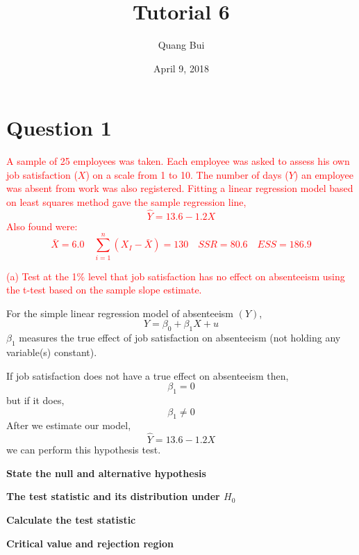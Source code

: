 \documentclass[12pt]{report}
\title{Tutorial 6}
\subtitle
{
\textbf{keywords}: hypothesis testing, t-test, test statistic, critical value, confidence intervals, R-squared, interpretation of coefficients, multiple linear regression, omitted variable bias

\textbf{estimated reading time}: 33 minutes
}
\author{Quang Bui}
\date{April 9, 2018}
\begin{document}
\maketitle

\section*{Question 1}
\noindent \textcolor{red}{A sample of 25 employees was taken. Each employee was asked to assess his own job satisfaction ($X$) on a scale from 1 to 10. The number of days ($Y$) an employee was absent from work was also registered. Fitting a linear regression model based on least squares method gave the sample regression line, $$\hat{Y} = 13.6 - 1.2X$$ Also found were: $$\bar{X} = 6.0 \quad \sum_{i=1}^{n}(X_I - \bar{X})=130 \quad SSR = 80.6 \quad ESS = 186.9$$}

\noindent \textcolor{red}{(a) Test at the 1\% level that job satisfaction has no effect on absenteeism using the t-test based on the sample slope estimate.}

\noindent For the simple linear regression model of absenteeism $(Y)$, $$Y = \beta_0 + \beta_1 X + u$$ $\beta_1$ measures the true effect of job satisfaction on absenteeism (not holding any variable(s) constant). 

\noindent If job satisfaction does not have a true effect on absenteeism then, $$\beta_1 = 0$$ but if it does,  $$\beta_1 \neq 0$$ After we estimate our model, $$\hat{Y} = 13.6 - 1.2X$$ we can perform this hypothesis test.

\noindent \textbf{State the null and alternative hypothesis}
\vspace{15mm}

\noindent \textbf{The test statistic and its distribution under $H_0$}

\newpage
\noindent \textbf{Calculate the test statistic}
\vspace{60mm}



\noindent \textbf{Critical value and rejection region}
\vspace{40mm}
\end{document}
